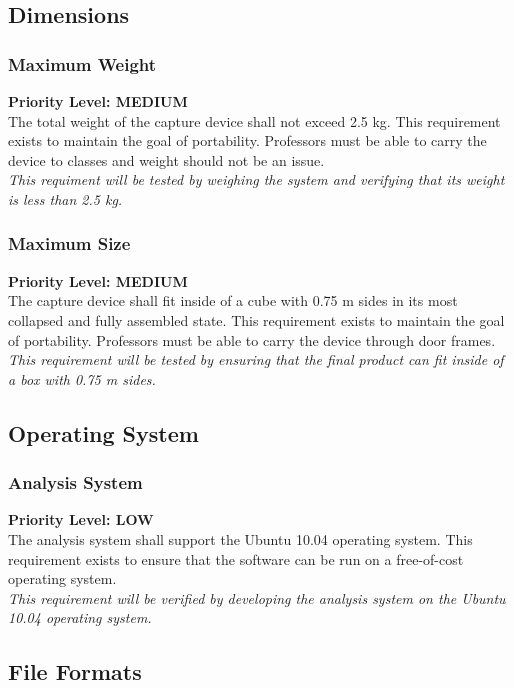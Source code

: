 \documentclass[]{article}
\begin{document}
		\subsection{Dimensions}
			
			\subsubsection{Maximum Weight}
				\textbf{Priority Level: MEDIUM}\\
				The total weight of the capture device shall not exceed 2.5 kg. This requirement exists to maintain the goal of portability. Professors must be able to carry the device to classes and weight should not be an issue. \\
				\emph{This requiment will be tested by weighing the system and verifying that its weight is less than 2.5 kg.}
				
			
			\subsubsection{Maximum Size}
				\textbf{Priority Level: MEDIUM}\\
				The capture device shall fit inside of a cube with 0.75 m sides in its most collapsed and fully assembled state. This requirement exists to maintain the goal of portability. Professors must be able to carry the device through door frames. \\
				\emph{This requirement will be tested by ensuring that the final product can fit inside of a box with 0.75 m sides.}

		\subsection{Operating System}
			
			\subsubsection{Analysis System}
				\textbf{Priority Level: LOW}\\
				The analysis system shall support the Ubuntu 10.04 operating system. This requirement exists to ensure that the software can be run on a free-of-cost operating system. \\
				\emph{This requirement will be verified by developing the analysis system on the Ubuntu 10.04 operating system.}
				
		
		\subsection{File Formats}
			
\end{document}
